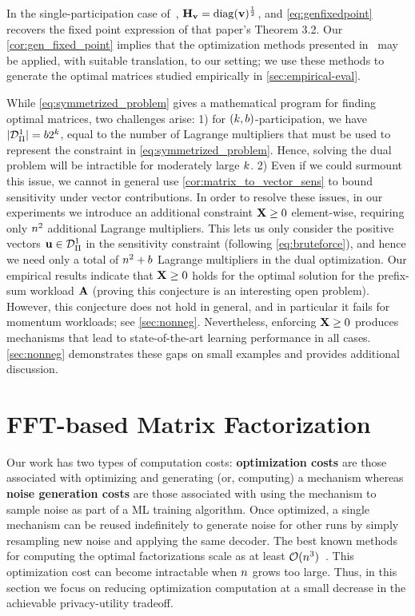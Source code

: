 \documentclass{article} %
\theoremstyle{named}
\begin{document}
 In the single-participation case of~\citet{denisov22matfact}, $\mathbf{H}_{\mathbf{v}} = \operatorname{diag}(\mathbf{v})^\frac{1}{2}$, and \cref{eq:genfixedpoint} recovers the fixed point expression of that paper's Theorem 3.2. Our \cref{cor:gen_fixed_point} implies that the optimization methods presented in~\citet{denisov22matfact} may be applied, with suitable translation, to our setting; we use these methods to generate the optimal matrices studied empirically in \cref{sec:empirical-eval}.


 While \cref{eq:symmetrized_problem} gives a mathematical program for finding optimal matrices, two challenges arise: 1) for $(k,b)$-participation, we have $|\mathcal{D}^1_\Pi| = b 2^k$, equal to the number of Lagrange multipliers that must be used to represent the constraint in \cref{eq:symmetrized_problem}. Hence, solving the dual problem will be intractible for moderately large $k$.  2) Even if we could surmount this issue, we cannot in general use \cref{cor:matrix_to_vector_sens} to bound sensitivity under vector contributions. In order to resolve these issues, in our experiments we introduce an additional constraint $\mathbf{X} \ge 0$ element-wise, requiring only $n^2$ additional Lagrange multipliers. This lets us only consider the positive vectors $\mathbf{u} \in \mathcal{D}^1_\Pi$ in the sensitivity constraint (following \cref{eq:bruteforce}), and hence we need only a total of $n^2 + b$ Lagrange multipliers in the dual optimization. Our empirical results indicate that $\mathbf{X} \ge 0$ holds for the optimal solution for the prefix-sum workload $\mathbf{A}$ (proving this conjecture is an interesting open problem). However, this conjecture does not hold in general, and in particular it fails for momentum workloads; see \cref{sec:nonneg}. Nevertheless, enforcing $\mathbf{X} \ge 0$ produces mechanisms that lead to state-of-the-art learning performance in all cases.  \cref{sec:nonneg} demonstrates these gaps on small examples and provides additional discussion.

\section{FFT-based Matrix Factorization}
\label{sec:fft}
Our work has two types of computation costs: \textbf{optimization costs} are those associated with optimizing and generating (or, computing) a mechanism whereas \textbf{noise generation costs} are those associated with using the mechanism to sample noise as part of a ML training algorithm. Once optimized, a single mechanism can be reused indefinitely to generate noise for other runs by simply resampling new noise and applying the same decoder.
The best known methods for computing the optimal factorizations scale as at least $\mathcal{O}(n^3)$~\citep{opt_convex_fact,denisov22matfact}. This optimization cost can become intractable when $n$ grows too large. Thus, in this section we focus on reducing optimization computation at a small decrease in the achievable privacy-utility tradeoff.
\end{document}
